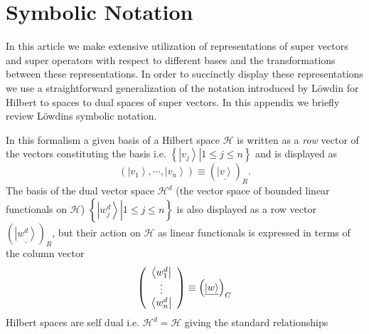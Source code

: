\documentclass[aps,preprint]{revtex4}%
\begin{document}
\appendix

\section{Symbolic Notation\label{symnot}}

In this article we make extensive utilization of representations of super
vectors and super operators with respect to different bases and the
transformations between these representations. In order to succinctly display
these representations we use a straightforward generalization of the notation
introduced by L\"{o}wdin \cite{Lowdin} for Hilbert to spaces to dual spaces of
super vectors. In this appendix we briefly review L\"{o}wdins symbolic notation.

In this formalism a given basis of a Hilbert space $\mathcal{H}$ is written as
a \emph{row }vector of the vectors constituting the basis i.e. $\left\{
\left.  \left\vert v_{j}\right\rangle \right\vert 1\leq j\leq n\right\}  $ and
is displayed as
\begin{equation}
\left(  \left\vert v_{1}\right\rangle ,\cdots,\left\vert v_{n}\right\rangle
\right)  \equiv\left(  \underline{\left\vert v\right\rangle }\right)  _{R}.
\end{equation}
The basis of the dual vector space $\mathcal{H}^{d}$ (the vector space of
bounded linear functionals on $\mathcal{H}$) $\left\{  \left.  \left\vert
w_{j}^{d}\right\rangle \right\vert 1\leq j\leq n\right\}  $ is also displayed
as a row vector $\left(  \underline{\left\vert w^{d}\right\rangle }\right)
_{R}$, but their action on $\mathcal{H}$ as linear functionals is expressed in
terms of the column vector%
\begin{equation}
\left(
\begin{array}
[c]{c}%
\left\langle w_{1}^{d}\right\vert \\
\vdots\\
\left\langle w_{n}^{d}\right\vert
\end{array}
\right)  \equiv\left(  \underline{\left\vert w\right\rangle }\right)  _{C}%
\end{equation}
Hilbert spaces are self dual i.e. $\mathcal{H}^{d}=\mathcal{H}$ giving the
standard relationships
\end{document}
